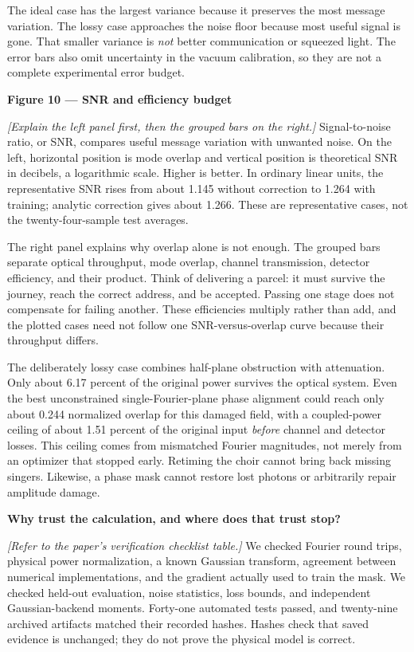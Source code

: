 \documentclass[11pt,letterpaper]{article}
\newcommand{\cue}[1]{\par\textbf{#1}\par}
\newcommand{\stage}[1]{\textit{[#1]}}
\begin{document}
The ideal case has the largest variance because it preserves the most message variation. The lossy case approaches the noise floor because most useful signal is gone. That smaller variance is \emph{not} better communication or squeezed light. The error bars also omit uncertainty in the vacuum calibration, so they are not a complete experimental error budget.

\cue{Figure 10 --- SNR and efficiency budget}
\stage{Explain the left panel first, then the grouped bars on the right.}
Signal-to-noise ratio, or SNR, compares useful message variation with unwanted noise. On the left, horizontal position is mode overlap and vertical position is theoretical SNR in decibels, a logarithmic scale. Higher is better. In ordinary linear units, the representative SNR rises from about 1.145 without correction to 1.264 with training; analytic correction gives about 1.266. These are representative cases, not the twenty-four-sample test averages.

The right panel explains why overlap alone is not enough. The grouped bars separate optical throughput, mode overlap, channel transmission, detector efficiency, and their product. Think of delivering a parcel: it must survive the journey, reach the correct address, and be accepted. Passing one stage does not compensate for failing another. These efficiencies multiply rather than add, and the plotted cases need not follow one SNR-versus-overlap curve because their throughput differs.

The deliberately lossy case combines half-plane obstruction with attenuation. Only about 6.17 percent of the original power survives the optical system. Even the best unconstrained single-Fourier-plane phase alignment could reach only about 0.244 normalized overlap for this damaged field, with a coupled-power ceiling of about 1.51 percent of the original input \emph{before} channel and detector losses. This ceiling comes from mismatched Fourier magnitudes, not merely from an optimizer that stopped early. Retiming the choir cannot bring back missing singers. Likewise, a phase mask cannot restore lost photons or arbitrarily repair amplitude damage.

\cue{Why trust the calculation, and where does that trust stop?}
\stage{Refer to the paper's verification checklist table.}
We checked Fourier round trips, physical power normalization, a known Gaussian transform, agreement between numerical implementations, and the gradient actually used to train the mask. We checked held-out evaluation, noise statistics, loss bounds, and independent Gaussian-backend moments. Forty-one automated tests passed, and twenty-nine archived artifacts matched their recorded hashes. Hashes check that saved evidence is unchanged; they do not prove the physical model is correct.
\end{document}
